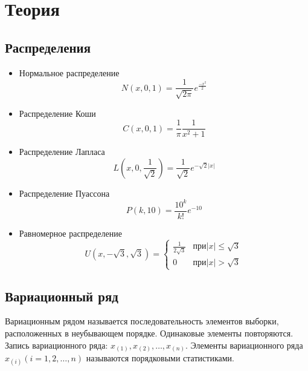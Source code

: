 \documentclass{article}
\begin{document}
\section {Теория}
\subsection{Распределения}
	\begin{itemize}
		\item Нормальное распределение \begin{equation}
										  N(x, 0, 1) = \frac{1}{\sqrt{2\pi}}e^{\frac{-x^2}{2}} \label{norm} 
									   \end{equation}
		\item Распределение Коши \begin{equation}
									C(x, 0, 1) = \frac{1}{\pi}\frac{1}{x^2+1} \label{koshi}
								 \end{equation} 
		\item Распределение Лапласа \begin{equation}
									   L(x, 0, \frac{1}{\sqrt{2}}) = \frac{1}{\sqrt{2}}e^{-\sqrt{2}|x|} \label{laplace} 
									\end{equation}
		\item Распределение Пуассона \begin{equation}
										P(k, 10) = \frac{10^k}{k!}e^{-10}\label{puasson}
									 \end{equation}
		\item Равномерное распределение \begin{equation}
				U(x, -\sqrt{3}, \sqrt{3}) =
				\begin{cases}
					\frac{1}{2\sqrt{3}} &\text{$при |x|\leq \sqrt{3}$}\\
					0 &\text{$при |x|>\sqrt{3}$}
				\end{cases}
				\label{uni} 
			\end{equation}
	\end{itemize}

\subsection{Вариационный ряд}
	\noindent Вариационным рядом называется последовательность элементов выборки, расположенных в неубывающем порядке. Одинаковые элементы повторяются.
	Запись вариационного ряда: $x_{(1)}, x_{(2)}, \ldots, x_{(n)}$.
	Элементы вариационного ряда $x_{(i)} (i = 1, 2, \ldots, n)$ называются порядковыми статистиками.
	
\end{document}
